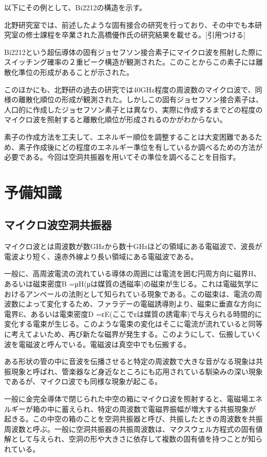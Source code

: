 以下にその例として、Bi2212の構造を示す。

北野研究室では、前述したような固有接合の研究を行っており、その中でも本研究室の修士課程を卒業された高橋優作氏の研究結果を載せる。[引用つける]

Bi2212という超伝導体の固有ジョセフソン接合素子にマイクロ波を照射した際にスイッチング確率の２重ピーク構造が観測された。このことからこの素子には離散化準位の形成があることが示された。

このほかにも、北野研の過去の研究では40GHz程度の周波数のマイクロ波で、同様の離散化順位の形成が観測された。しかしこの固有ジョセフソン接合素子は、人口的に作成したジョセフソン素子とは異なり、実際に作成するまでどの程度のマイクロ波を照射すると離散化順位が形成されるのかがわからない。

素子の作成方法を工夫して、エネルギー順位を調整することは大変困難であるため、素子作成後にどの程度のエネルギー準位を有しているか調べるための方法が必要である。今回は空洞共振器を用いてその準位を調べることを目指す。

\section{予備知識}
\subsection{マイクロ波空洞共振器}
マイクロ波とは周波数が数GHzから数十GHzほどの領域にある電磁波で、波長が電波より短く、遠赤外線より長い領域にある電磁波である。

一般に、高周波電流の流れている導体の周囲には電流を囲む円周方向に磁界H、あるいは磁束密度B =μH(μは媒質の透磁率)の磁束が生じる。これは電磁気学におけるアンペールの法則として知られている現象である。この磁束は、電流の周波数によって変化するため、ファラデーの電磁誘導則より、磁束に垂直な方向に電界E、あるいは電束密度D =εE(ここでεは媒質の誘電率)で与えられる時間的に変化する電束が生じる。このような電束の変化はそこに電流が流れていると同等に考えてよいため、再び新たな磁界が発生する。このようにして、伝搬していく波を電磁波と呼んでいる。電磁波は真空中でも伝搬する。

ある形状の管の中に音波を伝播させると特定の周波数で大きな音がなる現象は共振現象と呼ばれ、管楽器など身近なところにも応用されている馴染みの深い現象であるが、マイクロ波でも同様な現象が起こる。

一般に金完全導体で閉じられた中空の箱にマイクロ波を照射すると、電磁場エネルギーが箱の中に蓄えられ、特定の周波数で電磁界振幅が増大する共振現象が起きる。この中空の箱のことを空洞共振器と呼び、共振したときの周波数を共振周波数と呼ぶ。一般に空洞共振器の共振周波数は、マクスウェル方程式の固有値解として与えられ、空洞の形や大きさに依存して複数の固有値を持つことが知られている。

